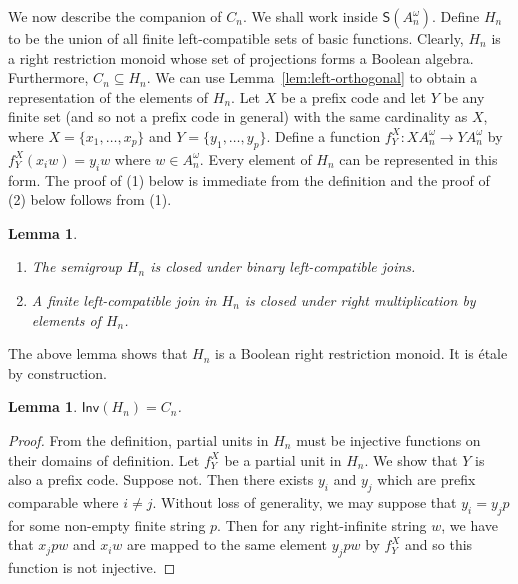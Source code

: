 \documentclass[a4paper]{amsart}
\newtheorem{lemma}[theorem]{Lemma}
\begin{document}
We now describe the companion of $C_{n}$.
We shall work inside $\mathsf{S}(A_{n}^{\omega})$.
Define $H_{n}$ to be the union of all finite left-compatible sets of basic functions.
Clearly, $H_{n}$ is a right restriction monoid
whose set of projections forms a Boolean algebra.
Furthermore, $C_{n} \subseteq H_{n}$.
We can use Lemma~\ref{lem:left-orthogonal} to obtain a representation
of the elements of $H_{n}$.
Let $X$ be a prefix code and let $Y$ be any finite set (and so not a prefix code in general) with the same cardinality as $X$,  
where $X = \{x_{1},\ldots, x_{p}\}$ and $Y = \{y_{1}, \ldots, y_{p}\}$.
Define a function $f^{X}_{Y} \colon XA_{n}^{\omega} \rightarrow YA_{n}^{\omega}$
by $f^{X}_{Y}(x_{i}w) = y_{i}w$ where $w \in A_{n}^{\omega}$.
Every element of $H_{n}$ can be represented in this form.
The proof of (1) below is immediate from the definition
and the proof of (2) below follows from (1).

\begin{lemma}\label{lem:semigroup-three}\mbox{} 
\begin{enumerate}
\item The semigroup  $H_{n}$  is closed under binary left-compatible joins.

\item A finite left-compatible join in $H_{n}$ is closed under right multiplication by elements of $H_{n}$.

\end{enumerate}
\end{lemma}

The above lemma shows that $H_{n}$ is a Boolean right restriction monoid.
It is \'etale by construction.

\begin{lemma}\label{lem:semigroup-four} 
$\mathsf{Inv}(H_{n}) = C_{n}$.
\end{lemma}
\begin{proof} From the definition, partial units in $H_{n}$ must be injective functions on their domains of definition.
Let $f^{X}_{Y}$ be a partial unit in $H_{n}$.
We show that $Y$ is also a prefix code.
Suppose not. 
Then there exists $y_{i}$ and $y_{j}$ which are prefix comparable where $i \neq j$.
Without loss of generality, we may
suppose that $y_{i} = y_{j}p$ for some non-empty finite string $p$.
Then for any right-infinite string $w$, we have that $x_{j}pw$ and $x_{i}w$ are mapped to the same element $y_{j}pw$
by $f^{X}_{Y}$ and so this function is not injective.
\end{proof}
\end{document}
